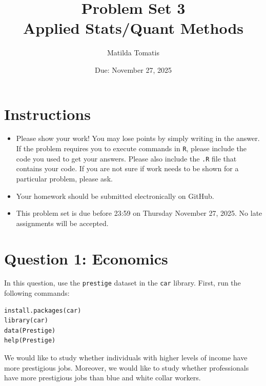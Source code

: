 \documentclass[12pt,letterpaper]{article}
\title{Problem Set 3 \\
	\large Applied Stats/Quant Methods }
\date{Due: November 27, 2025}
\author{Matilda Tomatis}
\begin{document}
	\maketitle
	\section*{Instructions}
	\begin{itemize}
		\item Please show your work! You may lose points by simply writing in the answer. If the problem requires you to execute commands in \texttt{R}, please include the code you used to get your answers. Please also include the \texttt{.R} file that contains your code. If you are not sure if work needs to be shown for a particular problem, please ask.
		\item Your homework should be submitted electronically on GitHub.
		\item This problem set is due before 23:59 on Thursday November 27, 2025. No late assignments will be accepted.
	\end{itemize}



	\vspace{.5cm}
\section*{Question 1: Economics}
\vspace{.25cm}
\noindent 	
In this question, use the \texttt{prestige} dataset in the \texttt{car} library. First, run the following commands:

\begin{verbatim}
install.packages(car)
library(car)
data(Prestige)
help(Prestige)
\end{verbatim} 


\noindent We would like to study whether individuals with higher levels of income have more prestigious jobs. Moreover, we would like to study whether professionals have more prestigious jobs than blue and white collar workers.
\end{document}
